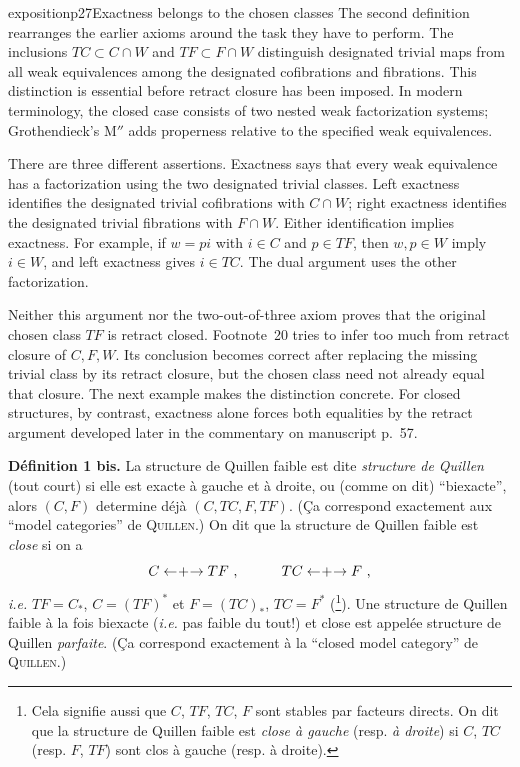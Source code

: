 \begin{dcomment}{exposition}{p27}{Exactness belongs to the chosen classes}
The second definition rearranges the earlier axioms around the task they have to perform. The inclusions $TC\subset C\cap W$ and $TF\subset F\cap W$ distinguish designated trivial maps from all weak equivalences among the designated cofibrations and fibrations. This distinction is essential before retract closure has been imposed. In modern terminology, the closed case consists of two nested weak factorization systems; Grothendieck's $\text{M}''$ adds properness relative to the specified weak equivalences.

There are three different assertions. Exactness says that every weak equivalence has a factorization using the two designated trivial classes. Left exactness identifies the designated trivial cofibrations with $C\cap W$; right exactness identifies the designated trivial fibrations with $F\cap W$. Either identification implies exactness. For example, if $w=pi$ with $i\in C$ and $p\in TF$, then $w,p\in W$ imply $i\in W$, and left exactness gives $i\in TC$. The dual argument uses the other factorization.

Neither this argument nor the two-out-of-three axiom proves that the original chosen class $TF$ is retract closed. Footnote~20 tries to infer too much from retract closure of $C,F,W$. Its conclusion becomes correct after replacing the missing trivial class by its retract closure, but the chosen class need not already equal that closure. The next example makes the distinction concrete. For closed structures, by contrast, exactness alone forces both equalities by the retract argument developed later in the commentary on manuscript p.~57.
\end{dcomment}


\noindent\textbf{Définition 1 bis.} La structure de Quillen faible est dite \textit{structure de Quillen} (tout court) si elle est exacte à gauche et à droite, ou (comme on dit) “biexacte”, alors $(C, F)$ determine déjà $(C, TC, F, TF)$. (Ça correspond exactement aux “model categories” de \textsc{Quillen}.) On dit que la structure de Quillen faible est \textit{close} si on a %
\[
C \mathrel{\leftarrow\mkern-4mu{+}\mkern-4mu\rightarrow} TF\ , \qquad\quad TC \mathrel{\leftarrow\mkern-4mu{+}\mkern-4mu\rightarrow} F\ ,
\]
\textit{i.e.} $TF = C_*$, $C = (TF)^*$ et $F = (TC)_*$, $TC = F^*$ (\footnote[21]{Cela signifie aussi que $C$, $TF$, $TC$, $F$ sont stables par facteurs directs. On dit que la structure de Quillen faible est \textit{close à gauche} (resp. \textit{à droite}) si $C$, $TC$ (resp. $F$, $TF$) sont clos à gauche (resp. à droite).}). Une structure de Quillen faible à la fois biexacte (\textit{i.e.} pas faible du tout!) et close est appelée structure de Quillen \textit{parfaite}. (Ça correspond exactement à la “closed model category” de \textsc{Quillen}.)

